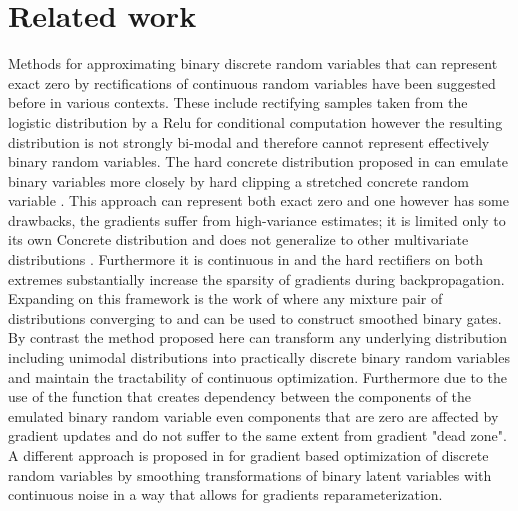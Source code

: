 \documentclass[final,1p,times]{elsarticle}
\begin{document}
\section{Related work}
\label{S:RelatedWork}
Methods for approximating binary discrete random variables that can represent exact zero by rectifications of continuous random variables have been suggested before in various contexts. These include rectifying samples taken from the logistic distribution by a Relu for conditional computation \cite{journals/corr/BengioLC13} however the resulting distribution is not strongly bi-modal and therefore cannot represent effectively binary random variables. The hard concrete distribution proposed in \cite{louizos2018learning} can emulate binary variables more closely by hard clipping a stretched concrete random variable \cite{maddison2016concrete, 45822}. This approach can represent both exact zero and one however has some drawbacks, the gradients suffer from high-variance estimates; it is limited only to its own Concrete distribution and does not generalize to other multivariate distributions \cite{Huang_2020_CVPR_Workshops}. Furthermore it is continuous in  and the hard rectifiers on both extremes substantially increase the sparsity of gradients during backpropagation. Expanding on this framework is the work of \cite{Huang_2020_CVPR_Workshops} where any mixture pair of distributions converging to  and  can be used to construct smoothed binary gates. By contrast the method proposed here can transform any underlying distribution including unimodal distributions into practically discrete binary random variables and maintain the tractability of continuous optimization. Furthermore due to the use of the  function that creates dependency between the components of the emulated binary random variable even components that are zero are affected by gradient updates and do not suffer to the same extent from gradient "dead zone". A different approach is proposed in \cite{rolfe2017discrete} for gradient based optimization of discrete random variables by smoothing transformations of binary latent variables with continuous noise in a way that allows for gradients reparameterization.
\end{document}
